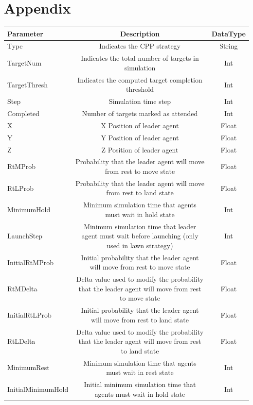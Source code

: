 \documentclass{report}
\begin{document}
\chapter{Appendix}
\thispagestyle{empty}
\begin{table}[h]
	\begin{center}
		\footnotesize
		\begin{tabular}{|l|c|c|}
		\hline
		\textbf{Parameter} & \textbf{Description} & \textbf{DataType} \\
		\hline
		Type & Indicates the CPP strategy & String \\
		TargetNum & Indicates the total number of targets in simulation & Int \\
		TargetThresh & Indicates the computed target completion threshold & Int \\
		Step & Simulation time step & Int \\
		Completed & Number of targets marked as attended & Int \\
		X & X Position of leader agent & Float \\
		Y & Y Position of leader agent & Float \\
		Z & Z Position of leader agent & Float \\
		RtMProb & Probability that the leader agent will move from rest to move state & Float \\
		RtLProb & Probability that the leader agent will move from rest to land state & Float \\
		MinimumHold & Minimum simulation time that agents must wait in hold state & Int \\
		LaunchStep & Minimum simulation time that leader agent must wait before launching (only used in lawn strategy) & Int \\
		InitialRtMProb & Initial probability that the leader agent will move from rest to move state & Float \\
		RtMDelta & Delta value used to modify the probability that the leader agent will move from rest to move state & Float \\
		InitialRtLProb & Initial probability that the leader agent will move from rest to land state & Float \\
		RtLDelta  & Delta value used to modify the probability that the leader agent will move from rest to land state & Float \\
		MinimumRest & Minimum simulation time that agents must wait in rest state & Int \\
		InitialMinimumHold & Initial minimum simulation time that agents must wait in hold state & Int \\

\end{tabular}
\end{center}
\end{table}
\end{document}
